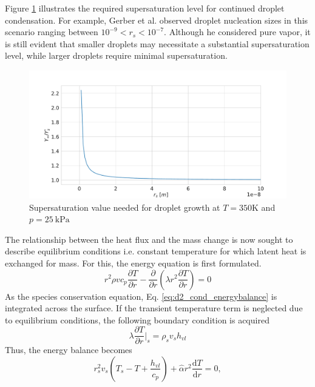 \documentclass[12pt]{article}
\numberwithin{equation}{section}
\begin{document}
Figure \ref{f:kelvin_supersat} illustrates the required supersaturation level for continued droplet condensation. For example, Gerber et al. \cite{gerber2004pressure} observed droplet nucleation sizes in this scenario ranging between $10^{-9}<r_{s}<10^{-7}$. Although he considered pure vapor, it is still evident that smaller droplets may necessitate a substantial supersaturation level, while larger droplets require minimal supersaturation.
\begin{figure}[H]
    \centering
    \includegraphics[trim={0 0 0 30},clip,width=1.0\textwidth]{Figures/Kelvin_supersat.pdf}
    \caption{Supersaturation value needed for droplet growth at $T=350 \mathrm{K}$ and $p=25\: \mathrm{kPa}$}
    \label{f:kelvin_supersat}
\end{figure}
The relationship between the heat flux and the mass change is now sought to describe equilibrium conditions i.e. constant temperature for which latent heat is exchanged for mass. For this, the energy equation is first formulated.
\begin{equation}\label{eq:d2_cond_energybalance}
    r^{2}\rho v c_{p}\frac{\partial T}{\partial r}-\frac{\partial}{\partial r}\left(\lambda r^{2}  \frac{\partial T}{\partial r}\right) =0
\end{equation}
As the species conservation equation, Eq. \ref{eq:d2_cond_energybalance} is integrated across the surface. If the transient temperature term is neglected due to equilibrium conditions, the following boundary condition is acquired 
\begin{equation}
    \lambda\frac{\partial T}{\partial r}|_{s}=\rho_{s} v_{s} h_{vl}
\end{equation}
Thus, the energy balance becomes
\begin{equation}
    r_{s}^{2}v_{s}(T_{s}-T+\frac{h_{vl}}{c_{p}})+\hat{\alpha} r^{2}\frac{\mathrm{d}T}{\mathrm{d}r}=0,
\end{equation}
\end{document}
